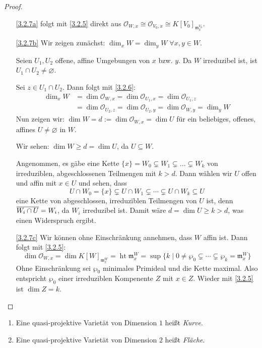 \documentclass[a4paper,12pt,index=toc]{scrbook}
\theoremstyle{keinenummern} %
\def\O{\mathcal{O}}
\def\m{\mathfrak{m}}
\newcommand{\hoehe}{\operatorname{ht}}
\newcommand{\leer}{\ensuremath{\varnothing}}
\renewcommand{\dotsc}{\ensuremath{\!...}}
\def\Bar#1{\ensuremath\overline{#1}}
\begin{document}
\begin{proof}
  \begin{enumerate}
  \item[\ref{3.2.7a}] folgt mit \cref{3.2.5} direkt aus $\O_{W,x}\cong \O_{V_0,x}\cong K[V_0]_{\m_x^{V_{0}}}$.
  \item[\ref{3.2.7b}] Wir zeigen zunächst: $\dim_x W=\dim_y W \; \forall x,y \in W$.
  
  Seien $U_1,U_2$ offene, affine Umgebungen von $x$ bzw. $y$. Da $W$ irreduzibel ist, ist $U_1\cap U_2\neq \leer$.  

  Sei $z\in U_1\cap U_2$. Dann folgt mit \cref{3.2.6}: 
  \begin{align*}\dim_x W&=\dim \O_{W,x}=\dim \O_{U_1,x}=\dim \O_{U_1,z}\\&=\dim \O_{U_2,z}=\dim \O_{U_2,y}=\dim \O_{W,y}=\dim_y W\end{align*}
%
Nun zeigen wir: $\dim W=d:=\dim \O_{W,x}=\dim U$ für ein beliebiges, offenes, affines $U\neq \leer$ in $W$.

Wir sehen: $\dim W\ge d=\dim U$, da $U\subseteq W$. 

Angenommen, es gäbe eine Kette $\{x\}=W_0 \subsetneq W_1 \subsetneq \dotsc \subsetneq W_k$ von irreduziblen, abgeschlossenen Teilmengen mit $k>d$. Dann wählen wir $U$ offen und affin mit $x\in U$ und sehen, dass 
\begin{equation*}U\cap W_0=\{x\} \subsetneq U\cap W_1 \subsetneq \dotsm \subsetneq U\cap W_k\subseteq U\end{equation*}
eine Kette von abgeschlossen, irreduziblen Teilmengen von $U$ ist, denn $\Bar{W_i\cap U}=W_i$, da $W_i$ irreduzibel ist. Damit wäre $d=\dim U\ge k>d$, was einen Widerspruch ergibt.
  \item[\ref{3.2.7c}] Wir können ohne Einschränkung annehmen, dass $W$ affin ist. Dann folgt mit \cref{3.2.5}:
\begin{equation*}\dim\O_{W,x}=\dim K[W]_{\m_x^W}=\hoehe \m_x^W=\sup \{k \mid 0\neq \wp_0 \subsetneq \dotsm \subsetneq \wp_k=\m_x^W\}\end{equation*}
Ohne Einschränkung sei $\wp_0$ minimales Primideal und die Kette maximal. Also entspricht $\wp_0$ einer irreduziblen Kompenente $Z$ mit $x\in Z$. Wieder mit \cref{3.2.5} ist $\dim Z=k$.
  \end{enumerate}
\end{proof}

\begin{dfn}\label{3.2.8}
  \begin{enumerate}
  \item{} Eine quasi-projektive Varietät von Dimension $1$ heißt \emph{Kurve}.
  \item{} Eine quasi-projektive Varietät von Dimension $2$ heißt \emph{Fläche}.
  \end{enumerate}
\end{dfn}
\end{document}

